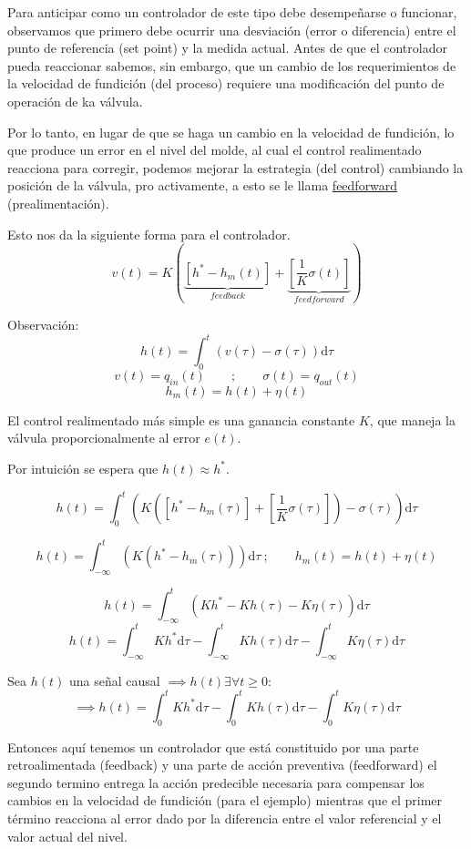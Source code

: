 \documentclass[a4paper]{article}
\begin{document}
Para anticipar como un controlador de este tipo debe desempeñarse o funcionar, observamos que primero debe ocurrir una desviación (error o diferencia) entre el punto de referencia (set point) y la medida actual. Antes de que el controlador pueda reaccionar sabemos, sin embargo, que un cambio de los requerimientos de la velocidad de fundición (del proceso) requiere una modificación del punto de operación de ka válvula.

Por lo tanto, en lugar de que se haga un cambio en la velocidad de fundición, lo que produce un error en el nivel del molde, al cual el control realimentado reacciona para corregir, podemos mejorar la estrategia (del control) cambiando la posición de la válvula, pro activamente, a esto se le llama \underline{feedforward} (prealimentación).

Esto nos da la siguiente forma para el controlador.
\begin{equation}\label{eq:controlador_completo}
		v(t) = K(\underbrace{\left[h^* - h_m(t)\right]}_{feedback}  + \underbrace{\left[\frac{1}{K} \sigma(t) \right]}_{feedforward}  )
\end{equation}

Observación:
\[h(t) = \int_{0}^{t}(v(\tau) - \sigma(\tau)) \mathrm{d}\tau\]
\[v(t) = q_{in}(t) \qquad;\qquad \sigma(t) = q_{out} (t) \]
\[h_m(t) = h(t) + \eta(t)\]

El control realimentado más simple es una ganancia constante $K$, que maneja la válvula proporcionalmente al error $e(t)$.

Por intuición se espera que $h(t) \approx h^*$.

\[h(t) = \int_{0}^{t}\left(K\left( \left[h^* - h_m(\tau) \right] + \left[ \frac{1}{K} \sigma(\tau) \right] \right) -\sigma(\tau)\right)\mathrm{d}\tau\]

\[h(t) = \int_{-\infty}^{t}\left(K(h^* - h_m(\tau)) \right) \mathrm{d}\tau~;\qquad h_m(t) = h(t) + \eta(t)\]

\[h(t) = \int_{-\infty}^{t}\left(Kh^* - Kh(\tau) - K\eta(\tau) \right) \mathrm{d}\tau\]
\[h(t) = \int_{-\infty}^{t}Kh^*\mathrm{d}\tau - \int_{-\infty}^{t}Kh(\tau) \mathrm{d}\tau - \int_{-\infty}^{t}K\eta(\tau) \mathrm{d}\tau\]

Sea $h(t)$ una señal causal $\implies h(t) \exists \forall t\ge 0 $:
\[\implies h(t) = \int_{0}^{t}Kh^*\mathrm{d}\tau - \int_{0}^{t}Kh(\tau)\mathrm{d}\tau - \int_{0}^{t}K\eta(\tau)\mathrm{d}\tau\]

Entonces aquí tenemos un controlador que está constituido por una parte retroalimentada (feedback) y una parte de acción preventiva (feedforward) el segundo termino entrega la acción predecible necesaria para compensar los cambios en la velocidad de fundición (para el ejemplo) mientras que el primer término reacciona al error dado por la diferencia entre el valor referencial y el valor actual del nivel.
\end{document}
